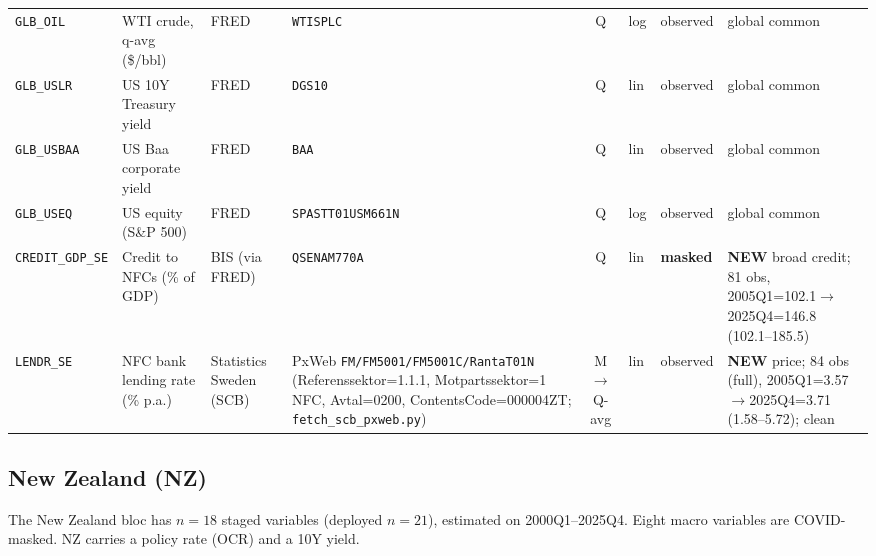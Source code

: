 {\begin{longtable}{@{}lp{2.9cm}p{1.9cm}p{2.0cm}cp{1.4cm}p{1.7cm}p{2.6cm}@{}}
\texttt{GLB\_OIL} & WTI crude, q-avg (\$/bbl) & FRED & \texttt{WTISPLC} & Q & log & observed & global common\\
\texttt{GLB\_USLR} & US 10Y Treasury yield & FRED & \texttt{DGS10} & Q & lin & observed & global common\\
\texttt{GLB\_USBAA} & US Baa corporate yield & FRED & \texttt{BAA} & Q & lin & observed & global common\\
\texttt{GLB\_USEQ} & US equity (S\&P 500) & FRED & \texttt{SPASTT01USM661N} & Q & log & observed & global common\\
\texttt{CREDIT\_GDP\_SE} & Credit to NFCs (\% of GDP) & BIS (via FRED) & \texttt{QSENAM770A} & Q & lin & \textbf{masked} & \textbf{NEW} broad credit; 81 obs, 2005Q1=102.1$\to$2025Q4=146.8 (102.1--185.5)\\
\texttt{LENDR\_SE} & NFC bank lending rate (\% p.a.) & Statistics Sweden (SCB) & PxWeb \texttt{FM/\allowbreak FM5001/\allowbreak FM5001C/\allowbreak RantaT01N} (Referenssektor=1.1.1, Motpartssektor=1 NFC, Avtal=0200, ContentsCode=000004ZT; \texttt{fetch\_scb\_pxweb.py}) & M$\to$Q-avg & lin & observed & \textbf{NEW} price; 84 obs (full), 2005Q1=3.57$\to$2025Q4=3.71 (1.58--5.72); clean\\
\end{longtable}}

\subsection{New Zealand (NZ)}\label{sec:data:NZ}

The New Zealand bloc has $n=18$ staged variables (deployed $n=21$), estimated on
2000Q1--2025Q4. Eight macro variables are COVID-masked. NZ carries a policy rate
(OCR) and a 10Y yield.

